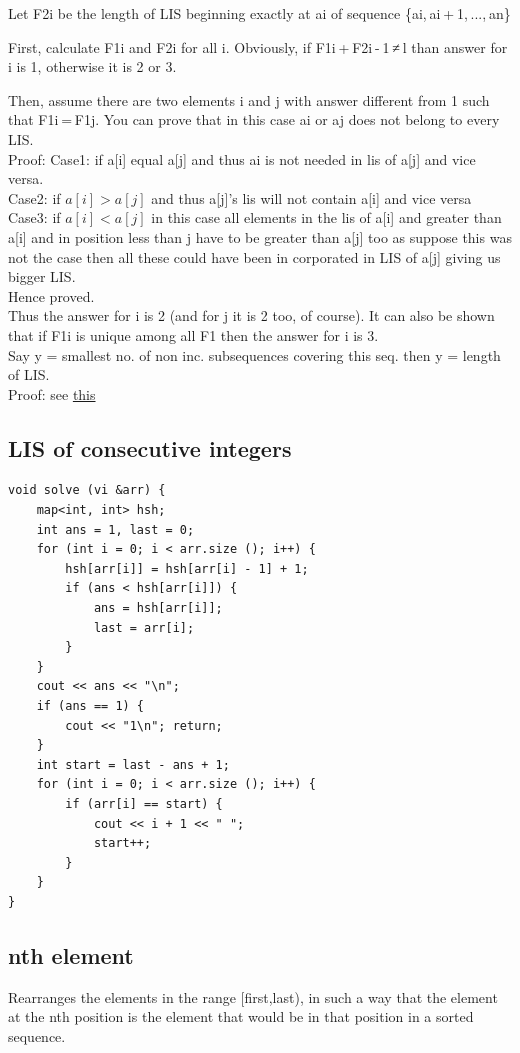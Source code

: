 \documentclass[8pt, a4paper, oneside, twocolumn]{extarticle}
\begin{document}
Let F2i be the length of LIS beginning exactly at ai of sequence \{ai, ai + 1, ..., an\}

First, calculate F1i and F2i for all i. Obviously, if F1i + F2i - 1 ≠ l than answer for i is 1, otherwise it is 2 or 3.

Then, assume there are two elements i and j with answer different from 1 such that F1i = F1j. You can prove that in this case ai or aj does not belong to every LIS.
\\Proof: 
Case1: if a[i] equal a[j] and thus ai is not needed in lis of a[j] and vice versa.
\\Case2: if $a[i] > a[j]$ and thus a[j]'s lis will not contain a[i] and vice versa
\\Case3: if $a[i] < a[j]$ in this case all elements in the lis of a[i] and greater than a[i] and in position less than j have to be greater than a[j] too as suppose this was not the case then all these could have been in corporated in LIS of a[j] giving us bigger LIS. 
\\Hence proved. 
\\Thus the answer for i is 2 (and for j it is 2 too, of course). It can also be shown that if F1i is unique among all F1 then the answer for i is 3.
\\Say y = smallest no. of non inc. subsequences covering this seq. then y = length of LIS.
\\Proof: see \href{https://github.com/sourabhxyz/Competitive-Programming/blob/master/Reference%20Notes/LIS%20Using%20Segment%20Trees/LongestIncreasingSubsequence.pdf}{this}
\subsection{LIS of consecutive integers}
\begin{verbatim}
void solve (vi &arr) {
    map<int, int> hsh;
    int ans = 1, last = 0;
    for (int i = 0; i < arr.size (); i++) {
        hsh[arr[i]] = hsh[arr[i] - 1] + 1;
        if (ans < hsh[arr[i]]) {
            ans = hsh[arr[i]];
            last = arr[i];
        }
    }
    cout << ans << "\n";
    if (ans == 1) {
        cout << "1\n"; return;
    }
    int start = last - ans + 1;
    for (int i = 0; i < arr.size (); i++) {
        if (arr[i] == start) {
            cout << i + 1 << " ";
            start++;
        }
    }
}
\end{verbatim}
\subsection{nth element}
Rearranges the elements in the range [first,last), in such a way that the element at the nth position is the element that would be in that position in a sorted sequence.
\end{document}
